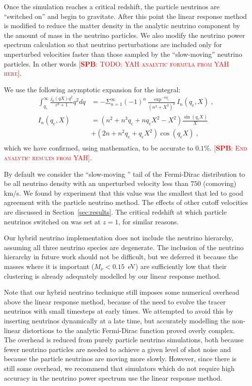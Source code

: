 \documentclass[useAMS, usenatbib]{mnras}
\newcommand{\spb}[1]{{\textsc{\textcolor{red}{[{\bf SPB}: #1]}}}}
\begin{document}
Once the simulation reaches a critical redshift, the particle neutrinos are ``switched on'' and begin to gravitate.
After this point the linear response method is modified to reduce the matter density in the analytic neutrino component by the amount of mass in the neutrino particles. We also modify the neutrino power spectrum calculation so that neutrino perturbations are included only for unperturbed velocities faster than those sampled by the ``slow-moving'' neutrino particles. 
In other words \spb{TODO: YAH analytic formula from YAH here}.

We use the following asymptotic expansion for the integral:
\begin{align}
 \int^\infty_{q_\mathrm{c}} \frac{j_0(qX) q^2}{e^q + 1} q^2 dq &= - \Sigma^{\infty}_{n=1} (-1)^n \frac{\exp^{-n q_\mathrm{c}}}{(n^2+X^2)^2} I_n(q_\mathrm{c},X) \;,\\
 I_n(q_\mathrm{c},X) &= (n^2 + n^3 q_\mathrm{c} + n q_\mathrm{c} X^2 - X^2) \frac{\sin(q_\mathrm{c} X)}{X} \\
 &+ (2n + n^2 q_\mathrm{c} + q_\mathrm{c} X^2) \cos(q_\mathrm{c} X)\;,\\
\end{align}
which we have confirmed, using mathematica, to be accurate to $0.1\%$.
\spb{End analytic results from YAH}.

By default we consider the ``slow-moving '' tail of the Fermi-Dirac distribution to be all neutrino density with an unperturbed velocity less than $750$ (comoving) km/s. We found by experiment that this value was the smallest that led to good agreement 
with the particle neutrino method. The effects of other cutoff velocities are discussed in Section~\ref{sec:results}.
The critical redshift at which particle neutrinos switched on was set at $z=1$, for similar reasons.

Our hybrid neutrino implementation does not include the neutrino hierarchy, assuming all three neutrino species are degenerate. The inclusion of the neutrino hierarchy in future work should not be difficult, but we deferred it because the masses where it is important ($M_\nu < 0.15$~eV) are sufficiently low that their clustering is already adequately modelled by our linear response method.

Note that our hybrid neutrino technique still imposes some numerical overhead above the linear response method, because of the need to evolve the tracer neutrinos with small timesteps at early times. We attempted to avoid this by inserting neutrinos dynamically at a late time, but accurately modelling the non-linear distortions to the analytic Fermi-Dirac function proved overly complex. The overhead is reduced from purely particle neutrino simulations, both because fewer neutrino particles are needed to achieve a given level of shot noise and because the particle neutrinos are moving more slowly. However, since there is still some overhead, we recommend that simulators which do not require high accuracy in the neutrino power spectrum use the linear response method.
\end{document}
